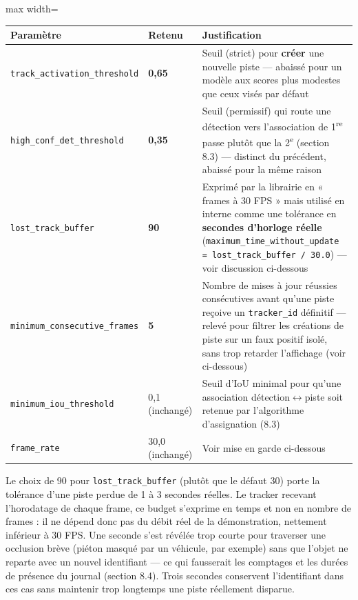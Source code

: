 \documentclass[11pt,a4paper]{article}
\begin{document}
    \begin{table}[!htbp]
    \centering
    \small
    \begin{adjustbox}{max width=\linewidth}
    \begin{tabular}{@{}p{5.2cm}p{1.6cm}p{7.6cm}@{}}
    \toprule
    \textbf{Paramètre} & \textbf{Retenu} & \textbf{Justification} \\
    \midrule
    \texttt{track\_activation\_threshold} & \textbf{0,65} & Seuil (strict) pour \textbf{créer} une nouvelle piste --- abaissé pour un modèle aux scores plus modestes que ceux visés par défaut \\
    \texttt{high\_conf\_det\_threshold} & \textbf{0,35} & Seuil (permissif) qui route une détection vers l'association de 1\textsuperscript{re} passe plutôt que la 2\textsuperscript{e} (section 8.3) --- distinct du précédent, abaissé pour la même raison \\
    \texttt{lost\_track\_buffer} & \textbf{90} & Exprimé par la librairie en « frames à 30 FPS » mais utilisé en interne comme une tolérance en \textbf{secondes d'horloge réelle} (\texttt{maximum\_time\_without\_update = lost\_track\_buffer / 30.0}) --- voir discussion ci-dessous \\
    \texttt{minimum\_consecutive\_frames} & \textbf{5} & Nombre de mises à jour réussies consécutives avant qu'une piste reçoive un \texttt{tracker\_id} définitif --- relevé pour filtrer les créations de piste sur un faux positif isolé, sans trop retarder l'affichage (voir ci-dessous) \\
    \texttt{minimum\_iou\_threshold} & 0,1 (inchangé) & Seuil d'IoU minimal pour qu'une association détection$\leftrightarrow$piste soit retenue par l'algorithme d'assignation (8.3) \\
    \texttt{frame\_rate} & 30,0 (inchangé) & Voir mise en garde ci-dessous \\
    \bottomrule
    \end{tabular}
    \end{adjustbox}
    \end{table}
    
    Le choix de 90 pour \texttt{lost\_track\_buffer} (plutôt que le défaut
    30) porte la tolérance d'une piste perdue de 1 à 3 secondes réelles.
    Le tracker recevant l'horodatage de chaque frame, ce budget s'exprime
    en temps et non en nombre de frames : il ne dépend donc pas du débit
    réel de la démonstration, nettement inférieur à 30 FPS. Une seconde
    s'est révélée trop courte pour traverser une occlusion brève (piéton
    masqué par un véhicule, par exemple) sans que l'objet ne reparte avec
    un nouvel identifiant --- ce qui fausserait les comptages et les durées
    de présence du journal (section 8.4). Trois secondes conservent
    l'identifiant dans ces cas sans maintenir trop longtemps une piste
    réellement disparue.
\end{document}
